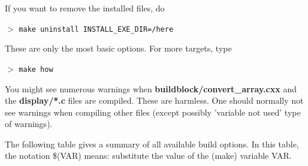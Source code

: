 \documentclass{article}
\newcommand{\cmdline}[1]{\par \noindent $>$ \texttt{#1}\par}
\begin{document}
If you want to remove the installed files, do
\cmdline{make uninstall INSTALL\_EXE\_DIR=/here}

These are only the most basic options. For more targets, 
type
\cmdline{make how}



You might see numerous warnings when \textbf{buildblock/convert\_array.cxx} 
and the \textbf{display/*.c} files are compiled. These are harmless. 
One should normally not see warnings when compiling other files 
(except possibly 'variable not used' type of warnings).


The following table gives a summary of all available build options. 
In this table, the notation \$(VAR) means: substitute the value of the
(make) variable VAR.


\newlength{\MakeTableFirstCol}
\newlength{\MakeTableSecondCol}
\setlength{\MakeTableFirstCol}{2.5in}
\setlength{\MakeTableSecondCol}{\textwidth}
\addtolength{\MakeTableSecondCol}{-\MakeTableFirstCol}
\end{document}
